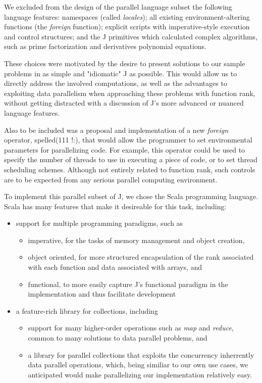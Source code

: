 We excluded from the design of the parallel language subset the following language features: 
namespaces (called \textit{locales});
all existing environment-altering functions (the \textit{foreign} function);
explicit scripts with imperative-style execution and control structures;
and the J primitives which calculated complex algorithms, such as prime factorization and derivatives polynomial equations.

These choices were motivated by the desire to present solutions to our sample problems in as simple and "idiomatic" J as possible.
This would allow us to directly address the involved computations, as well as the advantages to exploiting data parallelism when approaching these problems with function rank, 
without getting distracted with a discussion of J's more advanced or nuanced language features.

Also to be included was a proposal and implementation of a new \textit{foreign} operator, spelled\ttfamily (111 !:)\normalfont , 
that would allow the programmer to set environmental parameters for parallelizing code.
For example, this operator could be used to specify the number of threads to use in executing a piece of code, 
or to set thread scheduling schemes.
Although not entirely related to function rank, such controls are to be expected from any serious parallel computing environment.

To implement this parallel subset of J, we chose the Scala programming language.\cite{scala} 
Scala has many features that make it desireable for this task, including: 
\begin{itemize}
	\item support for multiple programming paradigms, such as
	\begin{itemize}
		\item imperative, for the tasks of memory management and object creation,
		\item object oriented, for more structured encapsulation of the rank associated with each function 
			and data associated with arrays, and
		\item functional, to more easily capture J's functional paradigm in the implementation and thus facilitate development
	\end{itemize}
	\item a feature-rich library for collections, including 
	\begin{itemize}
		\item support for many higher-order operations such as \textit{map} and \textit{reduce}, %
			common to many solutions to data parallel problems, and
		\item a library for parallel collections that exploits the concurrency inherrently data parallel operations,\cite{pc}
			which, being similiar to our own use cases, we anticipated would make parallelizing our implementation relatively easy.
	\end{itemize}
\end{itemize}


